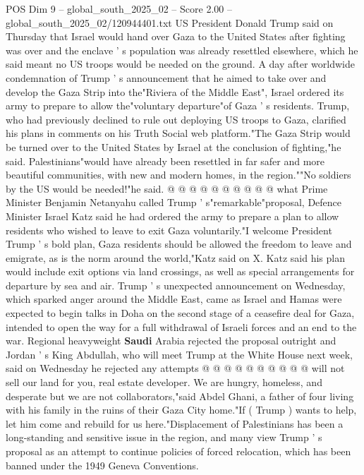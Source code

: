 \begin{textsample}{POS Dim 9 – global\_south\_2025\_02 – Score 2.00 – global\_south\_2025\_02/120944401.txt}  \label{ex:f9_pos_256}
US President Donald Trump said on Thursday that Israel would hand over Gaza to the United States after fighting was over and the enclave ' s population was already resettled elsewhere, which he said meant no US troops would be needed on the ground.
A day after worldwide condemnation of Trump ' s announcement that he aimed to take over and develop the Gaza Strip into the"Riviera of the Middle East", Israel ordered its army to prepare to allow the"voluntary departure"of Gaza ' s residents.
Trump, who had previously declined to rule out deploying US troops to Gaza, clarified his plans in comments on his Truth Social web platform."The Gaza Strip would be turned over to the United States by Israel at the conclusion of fighting,"he said.
Palestinians"would have already been resettled in far safer and more beautiful communities, with new and modern homes, in the region.""No soldiers by the US would be needed!"he said. @ @ @ @ @ @ @ @ @ @ what Prime Minister Benjamin Netanyahu called Trump ' s"remarkable"proposal, Defence Minister Israel Katz said he had ordered the army to prepare a plan to allow residents who wished to leave to exit Gaza voluntarily."I welcome President Trump ' s bold plan, Gaza residents should be allowed the freedom to leave and emigrate, as is the norm around the world,"Katz said on X.
Katz said his plan would include exit options via land crossings, as well as special arrangements for departure by sea and air.
Trump ' s unexpected announcement on Wednesday, which sparked anger around the Middle East, came as Israel and Hamas were expected to begin talks in Doha on the second stage of a ceasefire deal for Gaza, intended to open the way for a full withdrawal of Israeli forces and an end to the war.
Regional heavyweight \textbf{Saudi} Arabia rejected the proposal outright and Jordan ' s King Abdullah, who will meet Trump at the White House next week, said on Wednesday he rejected any attempts @ @ @ @ @ @ @ @ @ @ will not sell our land for you, real estate developer.
We are hungry, homeless, and desperate but we are not collaborators,"said Abdel Ghani, a father of four living with his family in the ruins of their Gaza City home."If ( Trump ) wants to help, let him come and rebuild for us here."Displacement of Palestinians has been a long-standing and sensitive issue in the region, and many view Trump ' s proposal as an attempt to continue policies of forced relocation, which has been banned under the 1949 Geneva Conventions.

\end{textsample}

